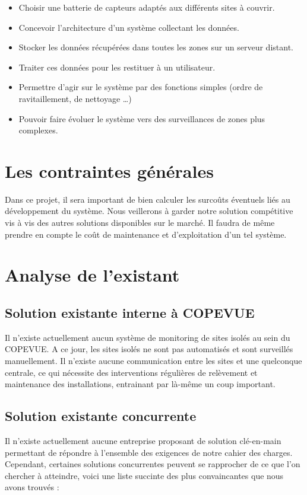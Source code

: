 \begin{itemize}
\item Choisir une batterie de capteurs adaptés aux différents sites à couvrir.
\item Concevoir l'architecture d'un système collectant les données.
\item Stocker les données récupérées dans toutes les zones sur un serveur distant.
\item Traiter ces données pour les restituer à un utilisateur.
\item Permettre d'agir sur le système par des fonctions simples (ordre de ravitaillement, de nettoyage …)
\item Pouvoir faire évoluer le système vers des surveillances de zones plus complexes.
\end{itemize}
    
\section{Les contraintes générales}
Dans ce projet, il sera important de bien calculer les surcoûts éventuels liés au développement du système. Nous veillerons à garder notre solution compétitive vis à vis des autres solutions disponibles sur le marché. Il faudra de même prendre en compte le coût de maintenance et d'exploitation d'un tel système.

\section{Analyse de l'existant}

\subsection{Solution existante interne à COPEVUE}

Il n’existe actuellement aucun système de monitoring de sites isolés au sein du COPEVUE. A ce jour, les sites isolés ne sont pas automatisés et sont surveillés manuellement. Il n’existe aucune communication entre les sites et une quelconque centrale, ce qui nécessite des interventions régulières de relèvement et maintenance des installations, entrainant par là-même un coup important.

\subsection{Solution existante concurrente}

Il n’existe actuellement aucune entreprise proposant de solution clé-en-main permettant de répondre à l'ensemble des exigences de notre cahier des charges. Cependant, certaines solutions concurrentes peuvent se rapprocher de ce que l'on chercher à atteindre, voici une liste succinte des plus convaincantes que nous avons trouvés :

